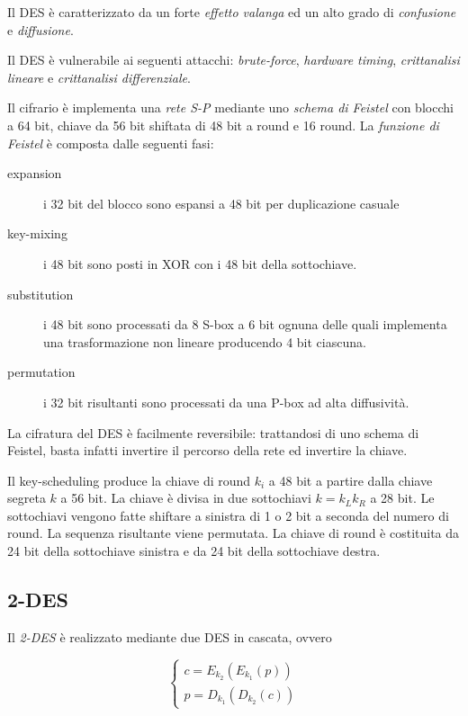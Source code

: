 Il DES è caratterizzato da un forte \textit{effetto valanga} ed un alto grado di \textit{confusione} e \textit{diffusione}.

Il DES è vulnerabile ai seguenti attacchi: \textit{brute-force}, \textit{hardware timing}, \textit{crittanalisi lineare} e \textit{crittanalisi differenziale}.

Il cifrario è implementa una \textit{rete S-P} mediante uno \textit{schema di Feistel} con blocchi a 64 bit, chiave da 56 bit shiftata di 48 bit a round e 16 round.
La \textit{funzione di Feistel} è composta dalle seguenti fasi:
\begin{description}
  \item[expansion] i 32 bit del blocco sono espansi a 48 bit per duplicazione casuale
  \item[key-mixing] i 48 bit sono posti in XOR con i 48 bit della sottochiave.
  \item[substitution] i 48 bit sono processati da 8 S-box a 6 bit ognuna delle quali implementa una trasformazione non lineare producendo 4 bit ciascuna.
  \item[permutation] i 32 bit risultanti sono processati da una P-box ad alta diffusività.
\end{description}

La cifratura del DES è facilmente reversibile: trattandosi di uno schema di Feistel, basta infatti invertire il percorso della rete ed invertire la chiave.

Il key-scheduling produce la chiave di round $k_{i}$ a 48 bit a partire dalla chiave segreta $k$ a 56 bit. La chiave è divisa in due sottochiavi $k=k_{L}k_{R}$ a 28 bit. Le sottochiavi vengono fatte shiftare a sinistra di 1 o 2 bit a seconda del numero di round. La sequenza risultante viene permutata. La chiave di round è costituita da 24 bit della sottochiave sinistra e da 24 bit della sottochiave destra.

\subsection{2-DES}
Il \textit{2-DES} è realizzato mediante due DES in cascata, ovvero

\begin{equation}
\begin{cases}
  c=E_{k_{2}}(E_{k_{1}}(p))\\
  p=D_{k_{1}}(D_{k_{2}}(c))
\end{cases}
\end{equation}

